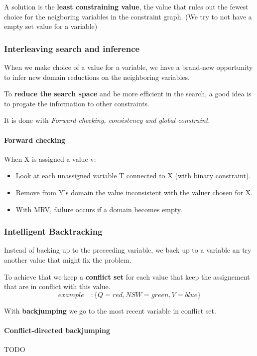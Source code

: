 A  solution is  the \textbf{least  constraining value},  the value  that
rules  out  the  fewest  choice  for the  neigboring  variables  in  the
constraint graph. (We try to not have a empty set value for a variable)


\subsubsection{Interleaving search and inference} 
When we make choice of a value for a variable, we have a brand-new opportunity to infer new
domain reductions on the neighboring variables.

To \textbf{reduce the search  space} and be more efficient in  the search, a good
idea is to progate the information to other constraints. 

It  is  done  with  \textit{Forward  checking,  consistency  and  global
constraint}.

\paragraph{\textbf{Forward checking} }
When X is assigned a value v:
\begin{itemize}
	\item Look at each unassigned variable T connected to X (with binary constraint).
	\item Remove from Y's domain the value inconsistent with the valuer chosen for X.
	\item With MRV, failure occurs if a domain becomes empty.
\end{itemize}

\subsubsection{Intelligent Backtracking}  Instead of  backing up  to the
preceeding variable, we back up to  a variable an try another value that
might fix the problem.

To achieve that we keep a \textbf{conflict set} for each value that keep
the assignement that are in conflict with this value.
$$ example  \quad : \{Q=red, NSW=green, V=blue \}$$

With \textbf{backjumping} we go to  the most recent variable in conflict
set.

\paragraph{Conflict-directed backjumping} TODO


